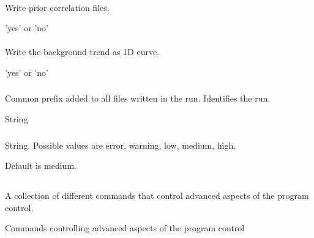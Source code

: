 \paragraph{}
 \slist
   \item \Description Write prior correlation files.
   \item \Argument 'yes' or 'no'
   \item \Default
 \elist

\paragraph{}
 \slist
   \item \Description Write the background trend as 1D curve.
   \item \Argument 'yes' or 'no'
   \item \Default
 \elist

\subsubsection{}
 \slist
   \item \Description Common prefix added to all files written in the run. Identifies the run.
   \item \Argument String
   \item \Default
 \elist

\subsubsection{}
 \slist
   \item \Description
   \item \Argument String. Possible values are error, warning, low, medium, high.
   \item \Default Default is medium.
 \elist

\subsection{} 
 \slist
   \item \Description A collection of different commands that control advanced aspects of the program control.
   \item \Argument Commands controlling advanced aspects of the program control
   \item \Default
 \elist

